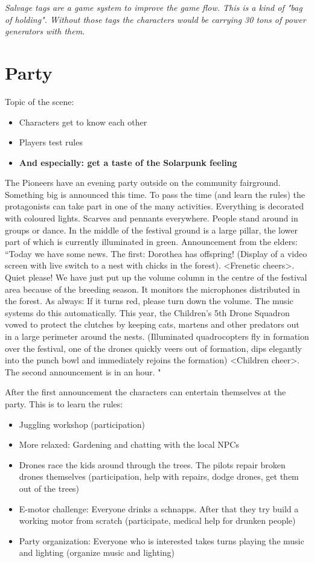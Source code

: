\emph{Salvage tags are a game system to improve the game flow. This is a kind of "bag of holding". Without those tags the characters would be carrying 30 tons of power generators with them.}


\section{Party}

Topic of the scene:
\begin{itemize}
\item Characters get to know each other
\item Players test rules
\item \textbf{And especially: get a taste of the Solarpunk feeling}
\end{itemize}

The Pioneers have an evening party outside on the community fairground. Something big is announced this time. To pass the time (and learn the rules) the protagonists can take part in one of the many activities.
Everything is decorated with coloured lights. Scarves and pennants everywhere. People stand around in groups or dance. In the middle of the festival ground is a large pillar, the lower part of which is currently illuminated in green.
Announcement from the elders: “Today we have some news. The first: Dorothea has offspring! (Display of a video screen with live switch to a nest with chicks in the forest). <Frenetic cheers>. Quiet please! We have just put up the volume column in the centre of the festival area because of the breeding season.
It monitors the microphones distributed in the forest.
As always: If it turns red, please turn down the volume. The music systems do this automatically. This year, the Children's 5th Drone Squadron vowed to protect the clutches by keeping cats, martens and other predators out in a large perimeter around the nests. (Illuminated quadrocopters fly in formation over the festival, one of the drones quickly veers out of formation, dips elegantly into the punch bowl and immediately rejoins the formation) <Children cheer>.
The second announcement is in an hour.
"

After the first announcement the characters can entertain themselves at the party. This is to learn the rules:

\begin{itemize}
\item Juggling workshop (participation)
\item More relaxed: Gardening and chatting with the local NPCs
\item Drones race the kids around through the trees. The pilots repair broken drones themselves (participation, help with repairs, dodge drones, get them out of the trees)
\item E-motor challenge: Everyone drinks a schnapps. After that they try build a working motor from scratch (participate, medical help for drunken people)
\item Party organization: Everyone who is interested takes turns playing the music and lighting (organize music and lighting)
\end{itemize}

